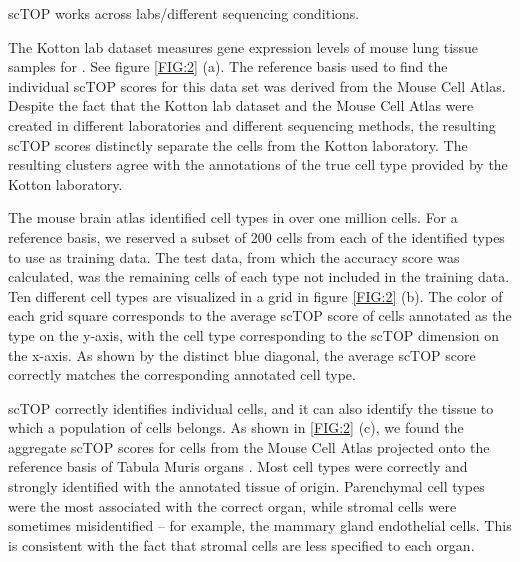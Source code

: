 \documentclass[aps,superscriptaddress, notitlepage,longbibliography]{revtex4-1}
\begin{document}
scTOP works across labs/different sequencing conditions.

The Kotton lab dataset  measures gene expression levels of mouse lung tissue samples for . See figure \ref{FIG:2} (a). The reference basis used to find the individual scTOP scores for this data set was derived from the Mouse Cell Atlas. Despite the fact that the Kotton lab dataset and the Mouse Cell Atlas were created in different laboratories and different sequencing methods, the resulting scTOP scores distinctly separate the cells from the Kotton laboratory. The resulting clusters agree with the annotations of the true cell type provided by the Kotton laboratory.

The mouse brain atlas identified  cell types in over one million cells. For a reference basis, we reserved a subset of 200 cells from each of the identified types to use as training data. The test data, from which the accuracy score was calculated, was the remaining cells of each type not included in the training data. Ten different cell types are visualized in a grid in figure \ref{FIG:2} (b). The color of each grid square corresponds to the average scTOP score of cells annotated as the type on the y-axis, with the cell type corresponding to the scTOP dimension on the x-axis. As shown by the distinct blue diagonal, the average scTOP score correctly matches the corresponding annotated cell type.

scTOP correctly identifies individual cells, and it can also identify the tissue to which a population of cells belongs. As shown in \ref{FIG:2} (c), we found the aggregate scTOP scores for cells from the Mouse Cell Atlas projected onto the reference basis of Tabula Muris organs . Most cell types were correctly and strongly identified with the annotated tissue of origin. Parenchymal cell types were the most associated with the correct organ, while stromal cells were sometimes misidentified -- for example, the mammary gland endothelial cells. This is consistent with the fact that stromal cells are less specified to each organ. 
\end{document}
